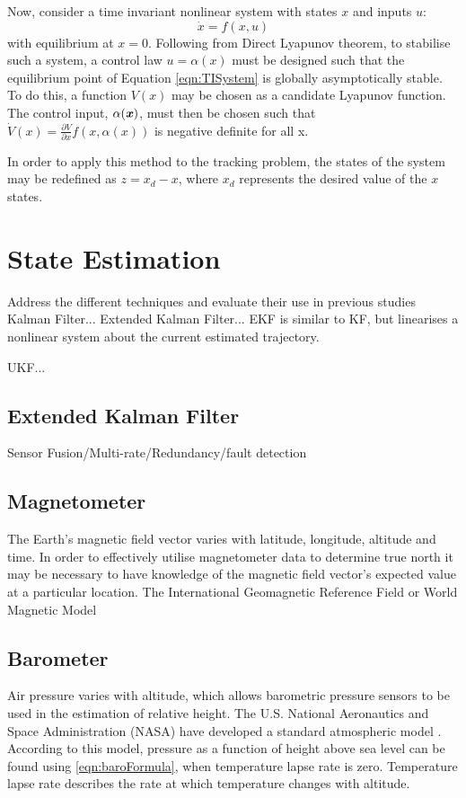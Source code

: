Now, consider a time invariant nonlinear system with states $x$ and inputs $u$:
\begin{equation}\label{eqn:TISystem}
\dot{x}=f(x,u)
\end{equation}
with equilibrium at $x=0$. Following from Direct Lyapunov theorem, to stabilise such a system, a control law $u=\alpha(x)$ must be designed such that the equilibrium point of Equation \ref{eqn:TISystem} is globally asymptotically stable. To do this, a function $V(x)$ may be chosen as a candidate Lyapunov function. The control input, $\alpha(\textbf{\textit{x}})$, must then be chosen such that $\dot{V}(x)=\frac{\partial V}{\partial x}f(x,\alpha(x))$ is negative definite for all x. 

In order to apply this method to the tracking problem, the states of the system may be redefined as $z=x_{d}-x$, where $x_{d}$ represents the desired value of the $x$ states.









\section{State Estimation}
Address the different techniques and evaluate their use in previous studies
Kalman Filter...
Extended Kalman Filter...
EKF is similar to KF, but linearises a nonlinear system about the current estimated trajectory.

UKF...

\subsection{Extended Kalman Filter}\label{section:EKFBackground}

Sensor Fusion/Multi-rate/Redundancy/fault detection

\subsection{Magnetometer}
The Earth's magnetic field vector varies with latitude, longitude, altitude and time. In order to effectively utilise magnetometer data to determine true north it may be necessary to have knowledge of the magnetic field vector's expected value at a particular location. The International Geomagnetic Reference Field or World Magnetic Model

\subsection{Barometer}\label{section:barometerBackground}
Air pressure varies with altitude, which allows barometric pressure sensors to be used in the estimation of relative height. The U.S. National Aeronautics and Space Administration (NASA) have developed a standard atmospheric model \cite{Oceanic1976}. According to this model, pressure as a function of height above sea level can be found using \eqref{eqn:baroFormula}, when temperature lapse rate is zero. Temperature lapse rate describes the rate at which temperature changes with altitude. 

